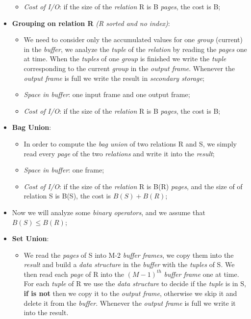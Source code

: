 \documentclass{article}
\begin{document}
\begin{itemize}
\begin{itemize}
\item \emph{Cost of I/O}: if the size of the \emph{relation} R is B \emph{pages}, the cost is B; 
\end{itemize}
\item \textbf{Grouping on relation R}\emph{ (R sorted and no index)}:
\begin{itemize}
\item We need to consider only the accumulated values for one \emph{group} (current) in the \emph{buffer}, we analyze the \emph{tuple} of the \emph{relation} by reading the \emph{pages} one at time. When the \emph{tuples} of one \emph{group} is finished we write the \emph{tuple} corresponding to the current \emph{group} in the \emph{output frame}. Whenever the \emph{output frame} is full we write the result in \emph{secondary storage};
\item \emph{Space in buffer}: one input frame and one output frame;
\item \emph{Cost of I/O}: if the size of the \emph{relation} R is B \emph{pages}, the cost is B; 
\end{itemize}
\item \textbf{Bag Union}:
\begin{itemize}
\item In order to compute the \emph{bag union} of two relations R and S, we simply read every \emph{page} of the two \emph{relations} and write it into the \emph{result};
\item \emph{Space in buffer}: one frame;
\item \emph{Cost of I/O}: if the size of the \emph{relation} R is B(R) \emph{pages}, and the size of of relation S is B(S), the cost is $B(S)+B(R)$;
\end{itemize}
\item Now we will analyze some \emph{binary operators}, and we assume that $B(S) \leq  B(R)$;
\item \textbf{Set Union}:
\begin{itemize}
\item We read the \emph{pages} of S into M-2 \emph{buffer frames}, we copy them into the \emph{result} and build a \emph{data structure} in the \emph{buffer} with the \emph{tuples} of S. We then read each \emph{page} of R into the $(M-1)^{th}$ \emph{buffer frame} one at time. For each \emph{tuple} of R we use the \emph{data structure} to decide if the \emph{tuple} is in S, \textbf{if is not} then we copy it to the \emph{output frame}, otherwise we skip it and delete it from the \emph{buffer}. Whenever the \emph{output frame} is full we write it into the result. 

\end{itemize}
\end{itemize}
\end{document}
